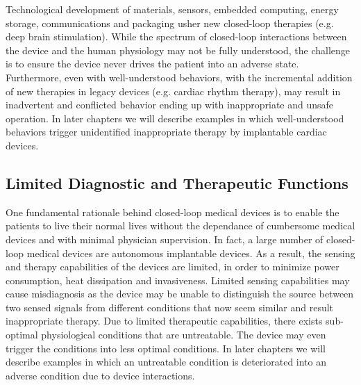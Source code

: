 Technological development of materials, sensors, embedded computing, energy storage, communications and packaging usher new closed-loop therapies (e.g. deep brain stimulation). While the spectrum of closed-loop interactions between the device and the human physiology may not be fully understood, the challenge is to ensure the device never drives the patient into an adverse state. Furthermore, even with well-understood behaviors, with the incremental addition of new therapies in legacy devices (e.g. cardiac rhythm therapy), may result in inadvertent and conflicted behavior ending up with inappropriate and unsafe operation. In later chapters we will describe examples in which well-understood behaviors trigger unidentified inappropriate therapy by implantable cardiac devices.

\subsection{Limited Diagnostic and Therapeutic Functions}
One fundamental rationale behind closed-loop medical devices is to enable the patients to live their normal lives without the dependance of cumbersome medical devices and with minimal physician supervision. In fact, a large number of closed-loop medical devices are autonomous implantable devices. As a result, the sensing and therapy capabilities of the devices are limited, in order to minimize power consumption, heat dissipation and invasiveness. Limited sensing capabilities may cause misdiagnosis as the device may be unable to distinguish the source between two sensed signals from different conditions that now seem similar and result inappropriate therapy. Due to limited therapeutic capabilities, there exists sub-optimal physiological conditions that are untreatable. The device may even trigger the conditions into less optimal conditions. In later chapters we will describe examples in which an untreatable condition is deteriorated into an adverse condition due to device interactions.

